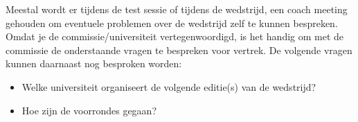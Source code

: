 	Meestal wordt er tijdens de test sessie of tijdens de wedstrijd, een coach meeting gehouden om eventuele problemen over de wedstrijd zelf te kunnen bespreken. Omdat je de commissie/universiteit vertegenwoordigd, is het handig om met de commissie de onderstaande vragen te bespreken voor vertrek. De volgende vragen kunnen daarnaast nog besproken worden:
	\begin{itemize}
	\item Welke universiteit organiseert de volgende editie(s) van de wedstrijd?
	\item Hoe zijn de voorrondes gegaan?
	\end{itemize}	
